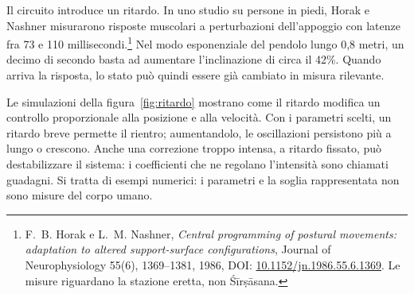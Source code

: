 \documentclass[11pt]{article}
\begin{document}
Il circuito introduce un ritardo. In uno studio su persone in piedi, Horak e Nashner misurarono risposte muscolari a perturbazioni dell'appoggio con latenze fra 73 e 110 millisecondi.\footnote{F.~B. Horak e L.~M. Nashner, \emph{Central programming of postural movements: adaptation to altered support-surface configurations}, Journal of Neurophysiology 55(6), 1369--1381, 1986, DOI: \href{https://doi.org/10.1152/jn.1986.55.6.1369}{10.1152/jn.1986.55.6.1369}. Le misure riguardano la stazione eretta, non Śīrṣāsana.} Nel modo esponenziale del pendolo lungo 0,8 metri, un decimo di secondo basta ad aumentare l'inclinazione di circa il 42\%. Quando arriva la risposta, lo stato può quindi essere già cambiato in misura rilevante.

Le simulazioni della figura~\ref{fig:ritardo} mostrano come il ritardo modifica un controllo proporzionale alla posizione e alla velocità. Con i parametri scelti, un ritardo breve permette il rientro; aumentandolo, le oscillazioni persistono più a lungo o crescono. Anche una correzione troppo intensa, a ritardo fissato, può destabilizzare il sistema: i coefficienti che ne regolano l'intensità sono chiamati guadagni. Si tratta di esempi numerici: i parametri e la soglia rappresentata non sono misure del corpo umano.
\end{document}
